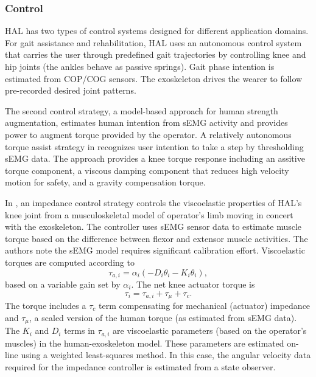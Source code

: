 \begin{refsection}
\subsubsection{Control}

HAL has two types of control systems designed for different application domains.  For gait assistance and rehabilitation, HAL uses an autonomous control system that carries the user through predefined gait trajectories by controlling knee and hip joints (the ankles behave as passive springs).  Gait phase intention is estimated from COP/COG sensors.  The exoskeleton drives the wearer to follow pre-recorded desired joint patterns.

The second control strategy, a model-based approach for human strength augmentation, estimates human intention from sEMG activity and provides power to augment torque provided by the operator.  A relatively autonomous torque assist strategy in \cite{HALmodelControlKnee2010} recognizes user intention to take a step by thresholding sEMG data.  The approach provides a knee torque response including an assitive torque component, a viscous damping component that reduces high velocity motion for safety, and a gravity compensation torque.  

In \cite{HALmuscleImped2005}, an impedance control strategy controls the viscoelastic properties of HAL's knee joint from a musculoskeletal model of operator's limb moving in concert with the exoskeleton.  The controller uses sEMG sensor data to estimate muscle torque based on the difference between flexor and extensor muscle activities.  The authors note the sEMG model requires significant calibration effort.  
Viscoelastic torques are computed according to
\[\tau_{a,i} = \alpha_i(-D_i \theta_i - K_i \theta_i),\]  
based on a variable gain set by $\alpha_i$.  The net knee actuator torque is
\[\tau_i = \tau_{a,i} + \tau_\mu + \tau_c .\]
The torque includes a $\tau_c$ term compensating for mechanical (actuator) impedance and $\tau_\mu$, a scaled version of the human torque (as estimated  from sEMG data).  The $K_i$ and $D_i$ terms in $\tau_{a,i}$ are viscoelastic parameters (based on the operator's muscles) in the human-exoskeleton model.  These parameters are estimated on-line using a weighted least-squares method.  In this case, the angular velocity data required for the impedance controller is estimated from a state observer.


\end{refsection}
